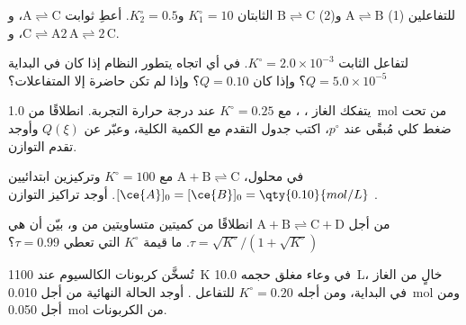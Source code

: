 \begin{exercise}[$\star\star$]\label{exo:b1:extent-q-and-k:5}
للتفاعلين (1) $\mathrm{A \rightleftharpoons B}$ و(2) $\mathrm{B \rightleftharpoons C}$ الثابتان
$K_1^\circ = 10$ و$K_2^\circ = 0.5$. أعطِ ثوابت $\mathrm{A \rightleftharpoons C}$،
و$\mathrm{C \rightleftharpoons A}$، و$\mathrm{2\,A \rightleftharpoons 2\,C}$.
\end{exercise}

\begin{exercise}[$\star\star$]\label{exo:b1:extent-q-and-k:6}
لتفاعل الثابت $K^\circ = 2.0 \times 10^{-3}$. في أي اتجاه
يتطور النظام إذا كان في البداية $Q = 5.0 \times 10^{-5}$؟ وإذا كان $Q = 0.10$؟
وإذا لم تكن حاضرة إلا المتفاعلات؟
\end{exercise}

\begin{exercise}[$\star\star$]\label{exo:b1:extent-q-and-k:7}
يتفكك الغاز ، ، مع $K^\circ = 0.25$ عند
درجة حرارة التجربة. انطلاقًا من \qty{1.0}{mol} من 
تحت ضغط كلي مُبقًى عند $p^\circ$، اكتب جدول التقدم مع
الكمية الكلية، وعبّر عن $Q(\xi)$ وأوجد تقدم التوازن.
\end{exercise}

\begin{exercise}[$\star\star$]\label{exo:b1:extent-q-and-k:8}
في محلول، $\mathrm{A + B \rightleftharpoons C}$ مع $K^\circ = 100$ وتركيزين
ابتدائيين $[\ce{A}]_0 = [\ce{B}]_0 = \qty{0.10}{mol/L}$. أوجد
تراكيز التوازن .
\end{exercise}

\begin{exercise}[$\star\star$]\label{exo:b1:extent-q-and-k:9}
من أجل $\mathrm{A + B \rightleftharpoons C + D}$ انطلاقًا من كميتين متساويتين من  و، بيّن أن
 هي $\tau = \sqrt{K^\circ}/(1 + \sqrt{K^\circ})$.
ما قيمة $K^\circ$ التي تعطي $\tau = 0.99$؟
\end{exercise}

\begin{exercise}[$\star\star\star$]\label{exo:b1:extent-q-and-k:10}
تُسخَّن كربونات الكالسيوم عند \qty{1100}{K} في وعاء مغلق حجمه
\qty{10.0}{L}، خالٍ من الغاز في البداية، ومن أجله $K^\circ = 0.20$ للتفاعل
. أوجد الحالة النهائية من أجل
\qty{0.010}{mol} ومن أجل \qty{0.050}{mol} من الكربونات.
\end{exercise}


